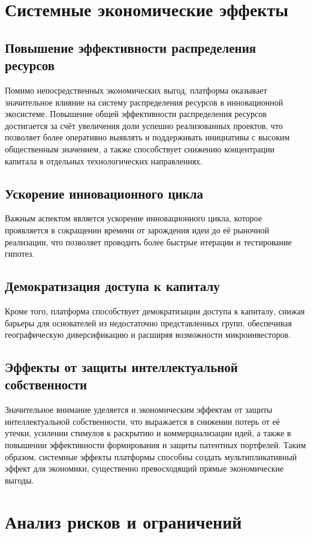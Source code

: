 \documentclass[
    candidate, %
    subf, %
    dotsinheaders=false,
]{disser}
\begin{document}
\section{Системные экономические эффекты}

\subsection{Повышение эффективности распределения ресурсов}
Помимо непосредственных экономических выгод, платформа оказывает значительное влияние на систему распределения ресурсов в инновационной экосистеме. Повышение общей эффективности распределения ресурсов достигается за счёт увеличения доли успешно реализованных проектов, что позволяет более оперативно выявлять и поддерживать инициативы с высоким общественным значением, а также способствует снижению концентрации капитала в отдельных технологических направлениях.

\subsection{Ускорение инновационного цикла}
Важным аспектом является ускорение инновационного цикла, которое проявляется в сокращении времени от зарождения идеи до её рыночной реализации, что позволяет проводить более быстрые итерации и тестирование гипотез.

\subsection{Демократизация доступа к капиталу}
Кроме того, платформа способствует демократизации доступа к капиталу, снижая барьеры для основателей из недостаточно представленных групп, обеспечивая географическую диверсификацию и расширяя возможности микроинвесторов.

\subsection{Эффекты от защиты интеллектуальной собственности}
Значительное внимание уделяется и экономическим эффектам от защиты интеллектуальной собственности, что выражается в снижении потерь от её утечки, усилении стимулов к раскрытию и коммерциализации идей, а также в повышении эффективности формирования и защиты патентных портфелей. Таким образом, системные эффекты платформы способны создать мультипликативный эффект для экономики, существенно превосходящий прямые экономические выгоды.

\section{Анализ рисков и ограничений}
\end{document}
